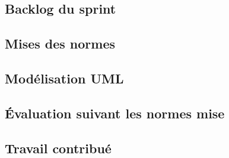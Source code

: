 \subsection{Backlog du sprint}

\subsection{Mises des normes}

\subsection{Modélisation UML}

\subsection{Évaluation suivant les normes mise}

\subsection{Travail contribué}
